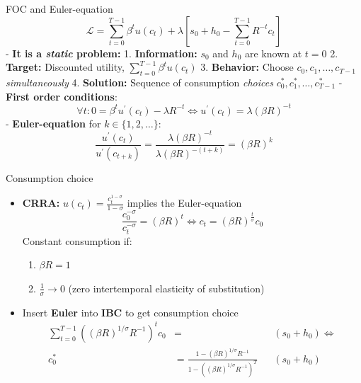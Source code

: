 \documentclass[
  10pt,
  ignorenonframetext,
  aspectratio=43,
  english,
]{beamer}
\providecommand{\tightlist}{%
  \setlength{\itemsep}{0pt}\setlength{\parskip}{0pt}}
\begin{document}
\begin{frame}{FOC and Euler-equation}
\protect{}\label{foc-and-euler-equation}
\[
\mathcal{L}=\sum^{T-1}_{t=0}\beta^{t}u(c_{t})+\lambda\left[s_{0}+h_{0}-\sum^{T-1}_{t=0}R^{-t}c_{t}\right]
\] - \textbf{It is a \emph{static} problem:} 1. \textbf{Information:}
\(s_{0}\) and \(h_{0}\) are known at \(t=0\) 2. \textbf{Target:}
Discounted utility, \(\sum^{T-1}_{t=0}\beta^{t}u(c_{t})\) 3.
\textbf{Behavior:} Choose \(c_{0},c_{1},\dots,c_{T-1}\)
\emph{simultaneously} 4. \textbf{Solution:} Sequence of consumption
\emph{choices} \(c^{\ast}_{0},c^{\ast}_{1},\dots,c^{\ast}_{T-1}\) -
\textbf{First order conditions}: \[
    \forall t:0=\beta^{t}u^{\prime}(c_{t})-\lambda R^{-t}\Leftrightarrow u^{\prime}(c_{t})=\lambda\left(\beta R\right)^{-t}
    \] - \textbf{Euler-equation} for \(k\in\{1,2,\dots\}\): \[
    \frac{u^{\prime}(c_{t})}{u^{\prime}(c_{t+k})}=\frac{\lambda\left(\beta R\right)^{-t}}{\lambda\left(\beta R\right)^{-(t+k)}}=\left(\beta R\right)^{k}
    \]
\end{frame}

\begin{frame}{Consumption choice}
\protect{}\label{consumption-choice}
\begin{itemize}
\tightlist
\item
  \textbf{CRRA:} \(u(c_{t})=\frac{c^{1-\sigma}_{t}}{1-\sigma}\) implies
  the Euler-equation \[
    \frac{c^{-\sigma}_{0}}{c^{-\sigma}_{t}}=\left(\beta R\right)^{t}\Leftrightarrow c_{t}=(\beta R)^{\frac{t}{\sigma}}c_{0}
    \] Constant consumption if:

  \begin{enumerate}
  \tightlist
  \item
    \(\beta R=1\)
  \item
    \(\frac{1}{\sigma}\rightarrow0\) (zero intertemporal elasticity of
    substitution)
  \end{enumerate}
\item
  Insert \textbf{Euler} into \textbf{IBC} to get consumption choice \[
    \begin{aligned}
    \sum^{T-1}_{t=0}\left((\beta R)^{1/\sigma}R^{-1}\right)^{t}c_{0} & = && (s_{0}+h_{0})\Leftrightarrow\\
    c^{\ast}_{0} & =  \frac{1-(\beta R)^{1/\sigma}R^{-1}}{1-\left((\beta R)^{1/\sigma}R^{-1}\right)^{T}}&&(s_{0}+h_{0})
    \end{aligned}
    \]
\end{itemize}
\end{frame}
\end{document}

